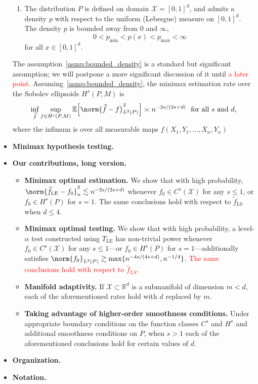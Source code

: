 \documentclass{article}
\newcommand{\Reals}{\mathbb{R}}
\newcommand{\1}{\mathbf{1}}
\newcommand{\Rd}{\Reals^d}
\newcommand{\Xset}{\mathcal{X}}
\newcommand{\Leb}{L}
\newcommand{\mc}[1]{\mathcal{#1}}
\newcommand{\Ebb}{\mathbb{E}}
\newcommand{\wt}[1]{\widetilde{#1}}
\newcommand{\wh}[1]{\widehat{#1}}
\newcommand{\LE}{\mathrm{LE}}
\newcommand{\LS}{\mathrm{LS}}
\theoremstyle{alden}
\theoremstyle{aldenthm}
\theoremstyle{definition}
\theoremstyle{remark}
\begin{document}
\begin{itemize}
	\begin{enumerate}[(P1)]
		\item 
		\label{asmp:bounded_density}
		The distribution $P$ is defined on domain $\Xset = [0,1]^d$, and admits a density $p$ with respect to the uniform (Lebesgue) measure on $[0,1]^d$. The density $p$ is bounded away from $0$ and $\infty$,
		\begin{equation*}
		0 < p_{\min} < p(x) < p_{\max} < \infty
		\end{equation*}
		for all $x \in [0,1]^d$.
	\end{enumerate}
	The assumption~\ref{asmp:bounded_density} is a standard but significant assumption; we will postpone a more significant discussion of it until \textcolor{red}{a later point}. Assuming~\ref{asmp:bounded_density}, the minimax estimation rate over the Sobolev ellipsoids $H^{s}(P,M)$ is
	\begin{equation*}
	\inf_{\wh{f}} \sup_{f \in H^s(P,M)} \Ebb\Bigl[\norm{\wh{f} - f}_{L^2(P)}^2\Bigr] \asymp n^{-2s/(2s + d)}~~\textrm{for all $s$ and $d$,}
	\end{equation*}
	where the infimum is over all measurable maps $\wh{f}(X_1,Y_1,\ldots,X_n,Y_n)$
	\item \textbf{Minimax hypothesis testing.}
	\item \textbf{Our contributions, long version.}
	\begin{itemize}
		\item \textbf{Minimax optimal estimation.}
		We show that with high probability,  $\norm{\wh{f}_{\LE} - f_0}_{n}^2 \lesssim n^{-2s/(2s + d)}$ whenever $f_0 \in C^s(\mc{X})$ for any $s \leq 1$, or $f_0 \in H^s(P)$ for $s = 1$. The same conclusions hold with respect to $\wt{f}_{\LS}$ when $d \leq 4$. 
		\item \textbf{Minimax optimal testing.}
		We show that with high probability, a level-$\alpha$ test constructed using $T_{\LE}$ has non-trivial power whenever $f_0 \in C^s(\mc{X})$ for any $s \leq 1$---or $f_0 \in H^s(P)$ for $s = 1$---additionally satisfies $\norm{f_0}_{\Leb^2(P)} \gtrsim \max\{n^{-4s/(4s + d)},n^{-1/4}\}$. \textcolor{red}{The same conclusions hold with respect to $\wh{f}_{LS}$.}
		\item \textbf{Manifold adaptivity.}
		If $\mc{X} \subset \Rd$ is a submanifold of dimension $m < d$, each of the aforementioned rates hold with $d$ replaced by $m$.
		\item \textbf{Taking advantage of higher-order smoothness conditions.} Under appropriate boundary conditions on the function classes $C^s$ and $H^s$ and additional smoothness conditions on $P$, when $s > 1$  each of the aforementioned conclusions hold for certain values of $d$.
	\end{itemize}
	\item \textbf{Organization.}
	\item \textbf{Notation.}
\end{itemize}
\end{document}
